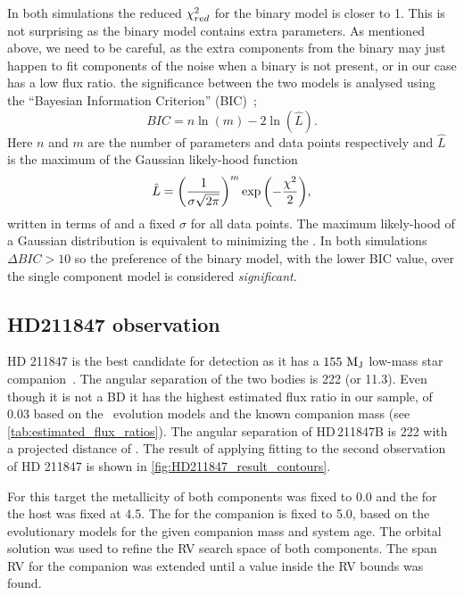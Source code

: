 In both simulations the reduced \({\chi}^{2}_{red}\) for the binary model is closer to 1.
This is not surprising as the binary model contains extra parameters.
As mentioned above, we need to be careful, as the extra components from the binary may just happen to fit components of the noise when a binary is not present, or in our case has a low flux ratio.
{\red{} the significance between the two models is analysed using the ``Bayesian Information Criterion'' ({BIC})~\citep{schwarz_estimating_1978}; }
\begin{equation}
{BIC} = n\ln{(m)} - 2\ln{(\hat{L})}.
\end{equation}
{\red{} Here \(n\) and \(m\) are the number of parameters and data points respectively and \(\hat{L}\) is the maximum of the Gaussian likely-hood function}
\begin{equation}
\hat{L} = {\left(\frac{1}{\sigma \sqrt{2\pi}}\right)}^{m} \exp{\left(-\frac{{\chi}^{2}}{2}\right)},
\end{equation}
{\red{} written in terms of \textchisquared{} and a fixed \(\sigma\) for all data points.
The maximum likely-hood of a Gaussian distribution is equivalent to minimizing the \textchisquared.
In both simulations \(\Delta {BIC} >10\) so the preference of the binary model, with the lower {BIC} value, over the single component model is considered \emph{significant}.}

\subsection{HD211847 observation}
\label{subsec:results-hd211847}
{HD 211847} is the best candidate for detection as it has a \(\rm 155~M_J\) low-mass star companion~\citet{moutou_eccentricity_2017}.
The angular separation of the two bodies is 222\mas{} (or 11.3\AU).
Even though it is not a {BD} it has the highest estimated flux ratio in our sample, of 0.03 based on the~\citet{baraffe_new_2015} evolution models and the known companion mass (see \cref{tab:estimated_flux_ratios}).
The angular separation of HD\,211847B is 222\mas{} with a projected distance of .
The result of applying \textchisquared{} fitting to the second observation of {HD 211847} is shown in \cref{fig:HD211847_result_contours}.

For this target the metallicity of both components was fixed to 0.0 and the \logg{} for the host was fixed at 4.5.
The \logg{} for the companion is fixed to 5.0, based on the~\citet{baraffe_new_2015} evolutionary models for the given companion mass and system age.
The orbital solution was used to refine the {RV} search space of both components.
The span {RV} for the companion was extended until a value inside the {RV} bounds was found.

